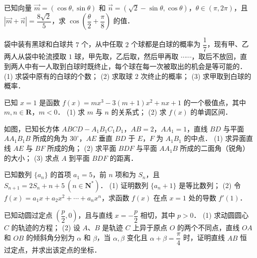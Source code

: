 \begin{question}
已知向量 $\vec{m} = (\cos\theta, \sin\theta)$ 和 $\vec{n} = (\sqrt{2}-\sin\theta, \cos\theta)$，$\theta \in (\pi, 2\pi)$，且 $|\vec{m} + \vec{n}| = \dfrac{8\sqrt{2}}{5}$，求 $\cos\left(\dfrac{\theta}{2} + \dfrac{\pi}{8}\right)$ 的值．

\end{question}
\begin{question}
袋中装有黑球和白球共 $7$ 个，从中任取 $2$ 个球都是白球的概率为 $\dfrac{1}{7}$，现有甲、乙两人从袋中轮流摸取 $1$ 球，甲先取，乙后取，然后甲再取 $\cdots\cdots$，取后不放回，直到两人中有一人取到白球时既终止，每个球在每一次被取出的机会是等可能的．
(1) 求袋中原有的白球的个数；
(2) 求取球 $2$ 次终止的概率；
(3) 求甲取到白球的概率．

\end{question}
\begin{question}
已知 $x = 1$ 是函数 $f(x) = mx^3 - 3(m+1)x^2 + nx + 1$ 的一个极值点，其中 $m, n \in \mathbf{R}$，$m < 0$．
(1) 求 $m$ 与 $n$ 的关系式；
(2) 求 $f(x)$ 的单调区间．

\Needspace{0.4\textheight}
\end{question}
\begin{question}
如图，已知长方体 $ABCD - A_1B_1C_1D_1$，$AB = 2$，$AA_1 = 1$，直线 $BD$ 与平面 $AA_1B_1B$ 所成的角为 $30^\circ$，$AE$ 垂直 $BD$ 于 $E$，$F$ 为 $A_1B_1$ 的中点．
(1) 求异面直线 $AE$ 与 $BF$ 所成的角；
(2) 求平面 $BDF$ 与平面 $AA_1B$ 所成的二面角（锐角）的大小；
(3) 求点 $A$ 到平面 $BDF$ 的距离．
\nopagebreak[4]
\begin{center}\end{center}
\nopagebreak[4]
\end{question}
\begin{question}
已知数列 $\{a_n\}$ 的首项 $a_1 = 5$，前 $n$ 项和为 $S_n$，且 $S_{n+1} = 2S_n + n + 5\ (n \in \mathbf{N}^*)$．
(1) 证明数列 $\{a_n + 1\}$ 是等比数列；
(2) 令 $f(x) = a_1 x + a_2 x^2 + \cdots + a_n x^n$，求函数 $f(x)$ 在点 $x = 1$ 处的导数 $f'(1)$．

\end{question}
\begin{question}
已知动圆过定点 $\left(\dfrac{p}{2}, 0\right)$，且与直线 $x = -\dfrac{p}{2}$ 相切，其中 $p > 0$．
(1) 求动圆圆心 $C$ 的轨迹的方程；
(2) 设 $A$、$B$ 是轨迹 $C$ 上异于原点 $O$ 的两个不同点，直线 $OA$ 和 $OB$ 的倾斜角分别为 $\alpha$ 和 $\beta$，当 $\alpha, \beta$ 变化且 $\alpha + \beta = \dfrac{\pi}{4}$ 时，证明直线 $AB$ 恒过定点，并求出该定点的坐标．

\end{question}